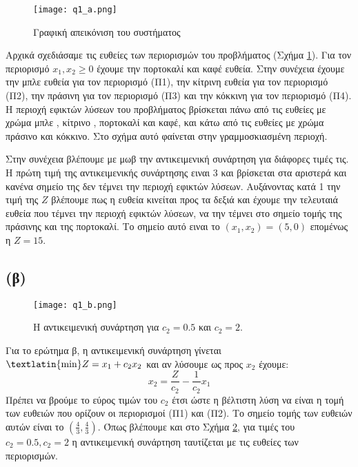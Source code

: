 \documentclass[12pt]{report}
\begin{document}
\begin{figure}[h]
    \centering
    \texttt{[image: q1\_a.png]}
    \caption{Γραφική απεικόνιση του συστήματος}
    \label{fig:1_a}
\end{figure}
Αρχικά σχεδιάσαμε τις ευθείες των περιορισμών του προβλήματος (Σχήμα
\ref{fig:1_a}). Για τον περιορισμό
$ {x_1 , x_2 \geq 0} $ έχουμε την πορτοκαλί και καφέ ευθεία. Στην συνέχεια
έχουμε την μπλε ευθεία για τον
περιορισμό (Π1), την κίτρινη ευθεία για τον περιορισμό (Π2), την πράσινη για
τον περιορισμό (Π3) και την
κόκκινη για τον περιορισμό (Π4). Η περιοχή εφικτών λύσεων του προβλήματος
βρίσκεται πάνω από τις ευθείες με χρώμα
μπλε , κίτρινο , πορτοκαλί και καφέ, και κάτω από τις ευθείες με χρώμα πράσινο
και κόκκινο. Στο σχήμα αυτό
φαίνεται στην γραμμοσκιασμένη περιοχή.

Στην συνέχεια βλέπουμε με μωβ την αντικειμενική συνάρτηση για διάφορες τιμές
τις. Η πρώτη τιμή της αντικειμενικής
συνάρτησης ειναι 3 και βρίσκεται στα αριστερά και κανένα σημείο της δεν τέμνει
την περιοχή εφικτών λύσεων.
Αυξάνοντας κατά 1 την τιμή της $ Z $ βλέπουμε πως η ευθεία κινείται προς τα
δεξιά και έχουμε την τελευταιά ευθεία
που τέμνει την περιοχή εφικτών λύσεων, να την τέμνει στο σημείο τομής της
πράσινης και της πορτοκαλί.
Το σημείο αυτό ειναι το $ {(x_1 , x_2) = (5 , 0)} $ επομένως η $ Z = 15 $. \\

\subsection*{(β)}
\begin{figure}[h]
    \texttt{[image: q1\_b.png]}
    \caption{Η αντικειμενική συνάρτηση για $c_2 = 0.5$ και $ c_2 = 2$.}
    \label{fig:1_b}
\end{figure}
Για το ερώτημα β, η αντικειμενική συνάρτηση γίνεται $ \text{\textlatin{min}} Z
    = x_1 + c_2x_2 $ και αν λύσουμε
ως προς $x_2$ έχουμε: $$ x_2 = \frac{Z}{c_2} - \frac{1}{c_2} x_1 $$
Πρέπει να βρούμε το εύρος τιμών του $c_2$ έτσι ώστε η βέλτιστη λύση να είναι η
τομή των ευθειών που ορίζουν οι
περιορισμοί (Π1) και (Π2). Το σημείο τομής των ευθειών αυτών είναι το
$(\frac{4}{3}, \frac{4}{3})$. Όπως
βλέπουμε και στο Σχήμα \ref{fig:1_b}, για τιμές του $c_2 = 0.5 , c_2 = 2$ η
αντικειμενική συνάρτηση ταυτίζεται
με τις ευθείες των περιορισμών.
\end{document}
